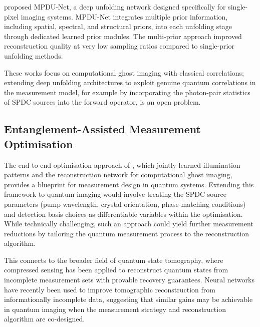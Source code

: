 \citet{zou2024} proposed MPDU-Net, a deep unfolding network designed specifically for single-pixel imaging systems. MPDU-Net integrates multiple prior information, including spatial, spectral, and structural priors, into each unfolding stage through dedicated learned prior modules. The multi-prior approach improved reconstruction quality at very low sampling ratios compared to single-prior unfolding methods.

These works focus on computational ghost imaging with classical correlations; extending deep unfolding architectures to exploit genuine quantum correlations in the measurement model, for example by incorporating the photon-pair statistics of SPDC sources into the forward operator, is an open problem.

\subsection{Entanglement-Assisted Measurement Optimisation}

The end-to-end optimisation approach of \citet{wang2019}, which jointly learned illumination patterns and the reconstruction network for computational ghost imaging, provides a blueprint for measurement design in quantum systems. Extending this framework to quantum imaging would involve treating the SPDC source parameters (pump wavelength, crystal orientation, phase-matching conditions) and detection basis choices as differentiable variables within the optimisation. While technically challenging, such an approach could yield further measurement reductions by tailoring the quantum measurement process to the reconstruction algorithm.

This connects to the broader field of quantum state tomography, where compressed sensing has been applied to reconstruct quantum states from incomplete measurement sets with provable recovery guarantees. Neural networks have recently been used to improve tomographic reconstruction from informationally incomplete data, suggesting that similar gains may be achievable in quantum imaging when the measurement strategy and reconstruction algorithm are co-designed.
